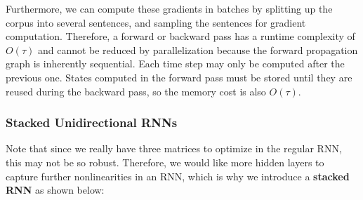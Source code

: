 \documentclass{article}
\begin{document}
    Furthermore, we can compute these gradients in batches by splitting up the corpus into several sentences, and sampling the sentences for gradient computation. Therefore, a forward or backward pass has a runtime complexity of $O(\tau)$ and cannot be reduced by parallelization because the forward propagation graph is inherently sequential. Each time step may only be computed after the previous one. States computed in the forward pass must be stored until they are reused during the backward pass, so the memory cost is also $O(\tau)$. 

  \subsubsection{Stacked Unidirectional RNNs}

    Note that since we really have three matrices to optimize in the regular RNN, this may not be so robust. Therefore, we would like more hidden layers to capture further nonlinearities in an RNN, which is why we introduce a \textbf{stacked RNN} as shown below: 
\end{document}
